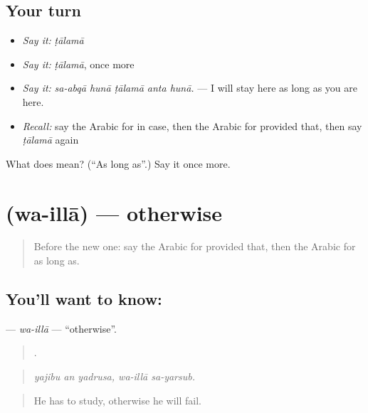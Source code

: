 \subsection*{Your turn}
\begin{itemize}
\raggedright
  \item \emph{Say it:} \emph{ṭālamā}
  \item \emph{Say it:} \emph{ṭālamā}, once more
  \item \emph{Say it:} \emph{sa-abqā hunā ṭālamā anta hunā.} — I will stay here as long as you are here.
  \item \emph{Recall:} say the Arabic for in case, then the Arabic for provided that, then say \emph{ṭālamā} again
\end{itemize}

\begin{tcolorbox}[breakable,colback=teal!4,colframe=teal!35!black,title={Before you move on}]
What does  mean? (\textquotedblleft{}As long as\textquotedblright{}.) Say it once more.
\end{tcolorbox}
\section[\texorpdfstring{\ar{وإلا} (wa-illā)}{وإلا (wa-illā)}]{ (wa-illā) — otherwise}

\label{lesson:AR-C399-wa-illa}



\begin{quote}
Before the new one: say the Arabic for provided that, then the Arabic for as long as.
\end{quote}

\subsection*{You'll want to know: }
\textbf{} — \emph{wa-illā} — \textquotedblleft{}otherwise\textquotedblright{}.

\begin{quote}
    .
\end{quote}

\begin{quote}
\emph{yajibu an yadrusa, wa-illā sa-yarsub.}
\end{quote}

\begin{quote}
He has to study, otherwise he will fail.
\end{quote}

